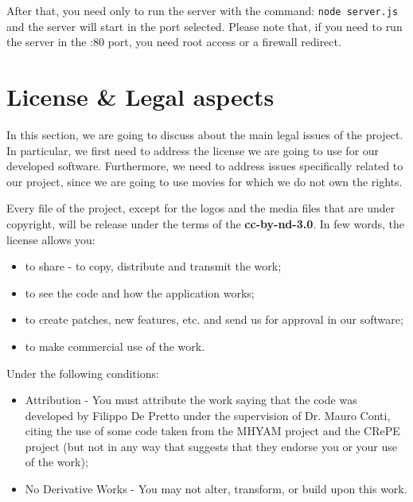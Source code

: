 

After that, you need only to run the server with the command: \texttt{node server.js} and the server will start in the port selected. Please note that, if you need to run the server in the :80 port, you need root access or a firewall redirect.

\newpage

\section{License \& Legal aspects}
\label{sec:legal}
In this section, we are going to discuss about the main legal issues of the project. In particular, we first need to address the license we are going to use for our developed software. Furthermore, we need to address issues specifically related to our project, since we are going to use movies for which we do not own the rights.

Every file of the project, except for the logos and the media files that are under copyright, will be release under the terms of the \textbf{cc-by-nd-3.0}. \cite{website:cc-by-nd-3.0} In few words, the license allows you:
\begin{itemize}
\item to share - to copy, distribute and transmit the work;
\item to see the code and how the application works;
\item to create patches, new features, etc. and send us for approval in our software;
\item to make commercial use of the work.
\end{itemize}

Under the following conditions:
\begin{itemize}
\item Attribution - You must attribute the work saying that the code was developed by Filippo De Pretto under the supervision of Dr. Mauro Conti, citing the use of some code taken from the MHYAM project \cite{MHYAM} and the CRePE project \cite{CVC:ISC:2010} (but not in any way that suggests that they endorse you or your use of the work);
\item No Derivative Works - You may not alter, transform, or build upon this work. 
\end{itemize}

